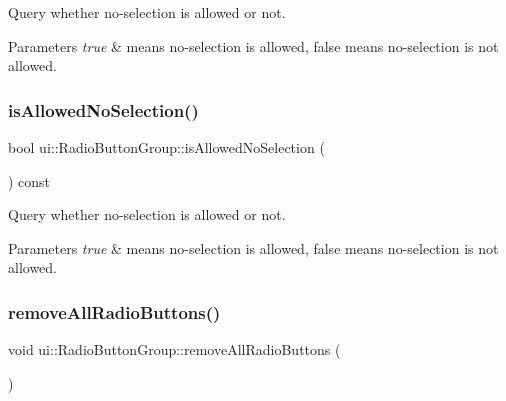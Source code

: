 Query whether no-\/selection is allowed or not.


\begin{DoxyParams}{Parameters}
{\em true} & means no-\/selection is allowed, false means no-\/selection is not allowed. \\
\hline
\end{DoxyParams}
\mbox{\label{classui_1_1RadioButtonGroup_a9eafb80fea9559a6838d46321063d79a}} 
\subsubsection{\texorpdfstring{is\+Allowed\+No\+Selection()}{isAllowedNoSelection()}\hspace{0.1cm}{\footnotesize\ttfamily [2/2]}}
{\footnotesize\ttfamily bool ui\+::\+Radio\+Button\+Group\+::is\+Allowed\+No\+Selection (\begin{DoxyParamCaption}{ }\end{DoxyParamCaption}) const}

Query whether no-\/selection is allowed or not.


\begin{DoxyParams}{Parameters}
{\em true} & means no-\/selection is allowed, false means no-\/selection is not allowed. \\
\hline
\end{DoxyParams}
\mbox{\label{classui_1_1RadioButtonGroup_a9408962c0d9e25cec34b69454aac127e}} 
\subsubsection{\texorpdfstring{remove\+All\+Radio\+Buttons()}{removeAllRadioButtons()}\hspace{0.1cm}{\footnotesize\ttfamily [1/2]}}
{\footnotesize\ttfamily void ui\+::\+Radio\+Button\+Group\+::remove\+All\+Radio\+Buttons (\begin{DoxyParamCaption}{ }\end{DoxyParamCaption})\hspace{0.3cm}{\ttfamily [virtual]}}

